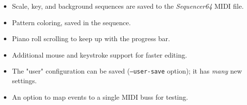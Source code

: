 \documentclass[
 11pt,
 twoside,
 a4paper,
 headinclude,
 footinclude,
 final                                 %
]{article}
\begin{document}
\begin{itemize}
      \item Scale, key, and background sequences
         are saved to the \textsl{Sequencer64} MIDI file.
      \item Pattern coloring, saved in the sequence.
      \item Piano roll scrolling to keep up with the progress bar.
      \item Additional mouse and keystroke support for faster editing.
      \item The "user" configuration can be saved
         (\texttt{--user-save} option); it has \textsl{many} new settings.
      \item An option to map events to a single MIDI buss for testing.

\end{itemize}
\end{document}
